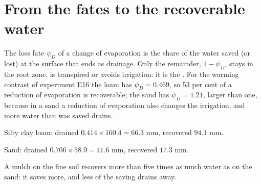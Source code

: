 \section{From the fates to the recoverable water}\label{sec:at-rec}
The loss fate $\psi_D$ of a change of evaporation is the share of the water saved (or lost) at the surface that ends as drainage. Only the remainder, $1-\psi_D$, stays in the root zone, is transpired or avoids irrigation: it is the . For the warming contrast of experiment E16 the loam has $\psi_D=0.469$, so 53 per cent of a reduction of evaporation is recoverable; the sand has $\psi_D=1.21$, larger than one, because in a sand a reduction of evaporation also changes the irrigation, and more water than was saved drains.

\sol
\par\noindent Silty clay loam: drained $0.414\times160.4=66.3$ mm, recovered $94.1$ mm.\finans
\par\noindent Sand: drained $0.706\times58.9=41.6$ mm, recovered $17.3$ mm.\finans
\par\noindent A mulch on the fine soil recovers more than five times as much water as on the sand: it saves more, and less of the saving drains away.
